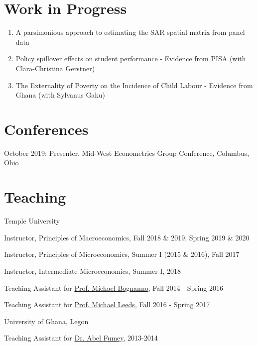 \documentclass[12pt,letterpaper]{article}
\renewenvironment{itemize}{
  \begin{list}{}{
    \setlength{\leftmargin}{1.5em}
  }
}{
  \end{list}
}
\begin{document}
\section*{Work in Progress}
\begin{enumerate}
	\item A parsimonious approach to estimating the SAR spatial matrix from panel data
	\item Policy spillover effects on student performance - Evidence from PISA (with Clara-Christina Gerstner)
	\item The Externality of Poverty on the Incidence of Child Labour - Evidence from Ghana (with Sylvanus Gaku)
\end{enumerate}

\section*{Conferences}
\begin{itemize}
	\item October 2019: Presenter, Mid-West Econometrics Group Conference, Columbus, Ohio
\end{itemize}

\section*{Teaching}
\begin{enumerate}
	\item Temple University
	\begin{itemize}
		\item Instructor, Principles of Macroeconomics, Fall 2018 \& 2019, Spring 2019 \& 2020
		\item Instructor, Principles of Microeconomics, Summer I (2015 \& 2016), Fall 2017
		\item Instructor, Intermediate Microeconomics, Summer I, 2018
		\item Teaching Assistant for \href{https://liberalarts.temple.edu/academics/faculty/bognanno-michael}{Prof. Michael Bognanno}, Fall 2014 - Spring 2016
		\item Teaching Assistant for \href{https://liberalarts.temple.edu/academics/faculty/leeds-michael}{Prof. Michael Leeds}, Fall 2016 - Spring 2017
	\end{itemize}
	\item University of Ghana, Legon
	\begin{itemize}
		\item Teaching Assistant for \href{https://www.ug.edu.gh/economics/staff/abel-fumey}{Dr. Abel Fumey}, 2013-2014
	\end{itemize}
\end{enumerate}
\end{document}
